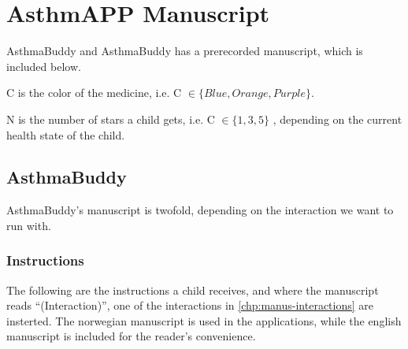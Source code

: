 \chapter{AsthmAPP Manuscript}
\label{chp:anuscript} %

AsthmaBuddy and AsthmaBuddy has a prerecorded manuscript, which is included below. 


C is the color of the medicine, i.e. C $\in \{ Blue, Orange, Purple \}$.


N is the number of stars a child gets, i.e. C $\in \{ 1, 3, 5 \}$ , depending on the current health state of the child.  


\section{AsthmaBuddy}
AsthmaBuddy's manuscript is twofold, depending on the interaction we want to run with.
\subsection{Instructions}
The following are the instructions a child receives, and where the manuscript reads ``(Interaction)'', one of the interactions in \ref{chp:manus-interactions} are insterted. The norwegian manuscript is used in the applications, while the english manuscript is included for the reader's convenience. 


